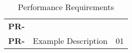 \resetfyshcounter
\newcommand{\pr}[2]{
	\textbf{PR-\rc} & #1 & #2 \\
	\hline
}
\begin{table}[H]
	\begin{tabularx}{\textwidth}{| a | x | a |}
		\hline
		     &  &    \\
		\hline
		\pr{}{}
		\pr{Example Description}{01}
	\end{tabularx}
	\caption{Performance Requirements}
\end{table}

